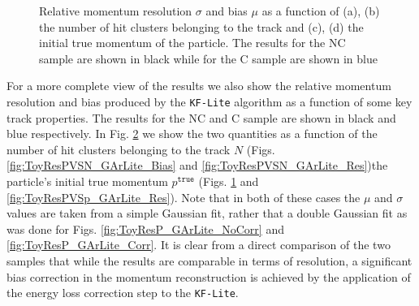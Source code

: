 \begin{figure}[t]
\begin{subfigure}[b]{0.42\textwidth}
         \caption{}
         \label{fig:ToyResPVSp_GArLite_Bias}
     \end{subfigure}
        \caption{Relative momentum resolution $\sigma$ and bias $\mu$ as a function of (a), (b) the number of hit clusters belonging to the track and (c), (d) the initial true momentum of the particle. The results for the NC sample are shown in black while for the C sample are shown in blue } \label{fig:ToyResPVS_GArLite}
\end{figure}



For a more complete view of the results we also show the relative momentum resolution and bias produced by the \texttt{KF-Lite} algorithm as a function of some key track properties. The results for the NC and C sample are shown in black and blue respectively.  In Fig. \ref{fig:ToyResPVS_GArLite} we show the two quantities as a function of the number of hit clusters belonging to the track $N$ (Figs. \ref{fig:ToyResPVSN_GArLite_Bias} and \ref{fig:ToyResPVSN_GArLite_Res})the particle's initial true momentum $p^\texttt{true}$ (Figs. \ref{fig:ToyResPVSp_GArLite_Bias} and \ref{fig:ToyResPVSp_GArLite_Res}). Note that in both of these cases the $\mu$ and $\sigma$ values are taken from a simple Gaussian fit, rather that a double Gaussian fit as was done for Figs. \ref{fig:ToyResP_GArLite_NoCorr} and \ref{fig:ToyResP_GArLite_Corr}. It is clear from a direct comparison of the two samples that while the results are comparable in terms of resolution, a significant bias correction in the momentum reconstruction is achieved by the application of the energy loss correction step to the \texttt{KF-Lite}. 

